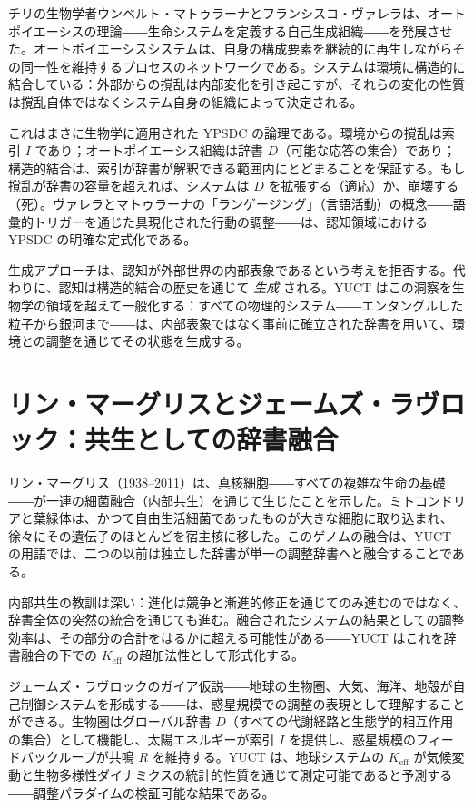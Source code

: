 \documentclass[12pt,a4paper]{article}
\begin{document}
	チリの生物学者ウンベルト・マトゥラーナとフランシスコ・ヴァレラは、オートポイエーシスの理論――生命システムを定義する自己生成組織――を発展させた。オートポイエーシスシステムは、自身の構成要素を継続的に再生しながらその同一性を維持するプロセスのネットワークである。システムは環境に構造的に結合している：外部からの撹乱は内部変化を引き起こすが、それらの変化の性質は撹乱自体ではなくシステム自身の組織によって決定される。
	
	これはまさに生物学に適用された YPSDC の論理である。環境からの撹乱は索引 \(I\) であり；オートポイエーシス組織は辞書 \(D\)（可能な応答の集合）であり；構造的結合は、索引が辞書が解釈できる範囲内にとどまることを保証する。もし撹乱が辞書の容量を超えれば、システムは \(D\) を拡張する（適応）か、崩壊する（死）。ヴァレラとマトゥラーナの「ランゲージング」（言語活動）の概念――語彙的トリガーを通じた具現化された行動の調整――は、認知領域における YPSDC の明確な定式化である。
	
	生成アプローチは、認知が外部世界の内部表象であるという考えを拒否する。代わりに、認知は構造的結合の歴史を通じて \emph{生成} される。YUCT はこの洞察を生物学の領域を超えて一般化する：すべての物理的システム――エンタングルした粒子から銀河まで――は、内部表象ではなく事前に確立された辞書を用いて、環境との調整を通じてその状態を生成する。
	
	\section{リン・マーグリスとジェームズ・ラヴロック：共生としての辞書融合}
	
	リン・マーグリス（1938–2011）は、真核細胞――すべての複雑な生命の基礎――が一連の細菌融合（内部共生）を通じて生じたことを示した。ミトコンドリアと葉緑体は、かつて自由生活細菌であったものが大きな細胞に取り込まれ、徐々にその遺伝子のほとんどを宿主核に移した。このゲノムの融合は、YUCT の用語では、二つの以前は独立した辞書が単一の調整辞書へと融合することである。
	
	内部共生の教訓は深い：進化は競争と漸進的修正を通じてのみ進むのではなく、辞書全体の突然の統合を通じても進む。融合されたシステムの結果としての調整効率は、その部分の合計をはるかに超える可能性がある――YUCT はこれを辞書融合の下での \(K_{\mathrm{eff}}\) の超加法性として形式化する。
	
	ジェームズ・ラヴロックのガイア仮説――地球の生物圏、大気、海洋、地殻が自己制御システムを形成する――は、惑星規模での調整の表現として理解することができる。生物圏はグローバル辞書 \(D\)（すべての代謝経路と生態学的相互作用の集合）として機能し、太陽エネルギーが索引 \(I\) を提供し、惑星規模のフィードバックループが共鳴 \(R\) を維持する。YUCT は、地球システムの \(K_{\mathrm{eff}}\) が気候変動と生物多様性ダイナミクスの統計的性質を通じて測定可能であると予測する――調整パラダイムの検証可能な結果である。
	
\end{document}
